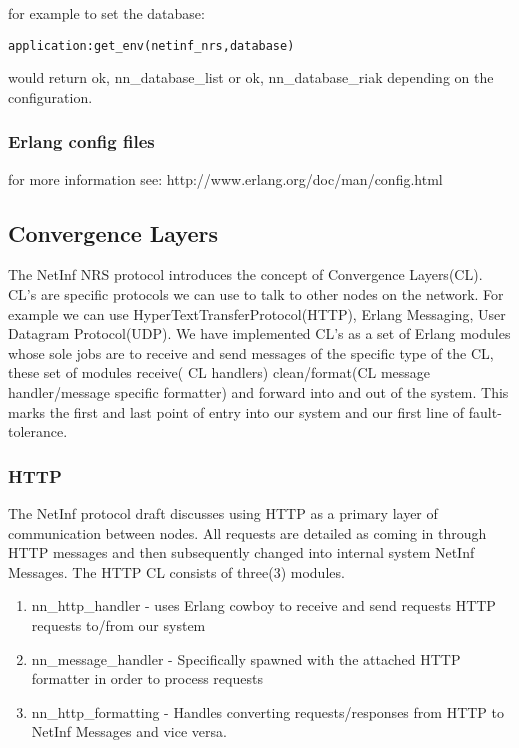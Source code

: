 \documentclass[11pt]{report}
\begin{document}
for example to set the database:

\begin {verbatim}
application:get_env(netinf_nrs,database) 
\end{verbatim}

would return {ok, nn\_database\_list} or {ok, nn\_database\_riak} depending on the configuration. 


\subsubsection  {Erlang config files}

for more information see: http://www.erlang.org/doc/man/config.html


\subsection {Convergence Layers}

The NetInf NRS protocol introduces the concept of Convergence Layers(CL). CL's are specific protocols we can use to talk to other nodes on the network. For example we can use HyperTextTransferProtocol(HTTP), Erlang Messaging, User Datagram Protocol(UDP). We have implemented CL's as a set of Erlang modules whose sole jobs are to receive and send messages of the specific type of the CL, these set of modules  receive( CL handlers) clean/format(CL message handler/message specific formatter) and forward into and out of the system. This marks the first and last point of entry into our system and our first line of fault-tolerance. 

\subsubsection{HTTP}

The NetInf protocol draft discusses using HTTP as a primary layer of communication between nodes. All requests are detailed as coming in through HTTP messages and then subsequently changed into internal system NetInf Messages. The HTTP CL consists of three(3) modules. 

\begin{enumerate}
\item nn\_http\_handler - uses Erlang cowboy to receive and send requests HTTP requests to/from our system
\item nn\_message\_handler - Specifically spawned with the attached HTTP formatter in order to process requests
\item nn\_http\_formatting - Handles converting requests/responses from HTTP  to NetInf Messages and vice versa.
\end{enumerate}
\end{document}
